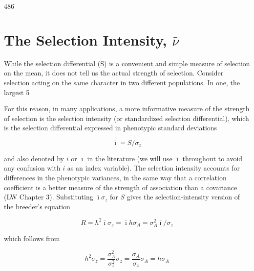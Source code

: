 \documentclass{article}
\begin{document}
486

\section{The Selection Intensity,  $ \bar{\nu} $}
While the selection differential (S) is a convenient and simple measure of selection on the mean, it does not tell us the actual strength of selection. Consider selection acting on the same character in two different populations. In one, the largest 5%

For this reason, in many applications, a more informative measure of the strength of selection is the selection intensity (or standardized selection differential), which is the selection differential expressed in phenotypic standard deviations

\begin{equation}
\bar{\imath}=S/\sigma_{z}
\tag{13.6a}
\label{eq:13_6a}
\end{equation}

and also denoted by  $ i $ or  $ \imath $ in the literature (we will use  $ \bar{\imath} $ throughout to avoid any confusion with  $ i $ as an index variable). The selection intensity accounts for differences in the phenotypic variances, in the same way that a correlation coefficient is a better measure of the strength of association than a covariance (LW Chapter 3). Substituting  $ \bar{\imath}\sigma_z $ for  $ S $ gives the selection-intensity version of the breeder's equation

\begin{equation}
R=h^{2}\bar{\imath}\sigma_{z}=\bar{\imath}h\sigma_{A}=\sigma_{A}^{2}\bar{\imath}/\sigma_{z}
\tag{13.6b}
\label{eq:13_6b}
\end{equation}

which follows from

\begin{equation}
h^{2}\sigma_{z}=\frac{\sigma_{A}^{2}}{\sigma_{z}^{2}}\sigma_{z}=\frac{\sigma_{A}}{\sigma_{z}}\sigma_{A}=h\sigma_{A}
\end{equation}
\end{document}
